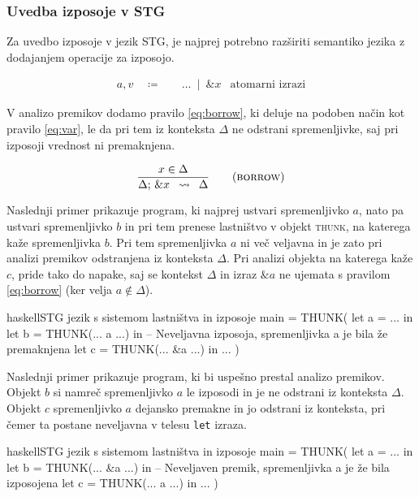 \subsubsection{Uvedba izposoje v STG}

Za uvedbo izposoje v jezik STG, je najprej potrebno razširiti semantiko jezika z dodajanjem operacije za izposojo.

\begin{align*}
	a, v \quad \coloneq& \quad \dots \enspace \vert \enspace \& x & \text{atomarni izrazi}
\end{align*}


V analizo premikov dodamo pravilo \ref{eq:borrow}, ki deluje na podoben način kot pravilo \ref{eq:var}, le da pri tem iz konteksta $\Delta$ ne odstrani spremenljivke, saj pri izposoji vrednost ni premaknjena.

\begin{equation}
\infers[borrow]{
    x \in \Delta
}{
    \Delta; \, \& x
}{
	\Delta
}
\label{eq:borrow}
\end{equation}

Naslednji primer prikazuje program, ki najprej ustvari spremenljivko $a$, nato pa ustvari spremenljivko $b$ in pri tem prenese lastništvo v objekt \textsc{thunk}, na katerega kaže spremenljivka $b$. Pri tem spremenljivka $a$ ni več veljavna in je zato pri analizi premikov odstranjena iz konteksta $\Delta$. Pri analizi objekta na katerega kaže $c$, pride tako do napake, saj se kontekst $\Delta$ in izraz $\&a$ ne ujemata s pravilom \ref{eq:borrow} (ker velja $a \notin \Delta$).

\begin{code-box}{haskell}{STG jezik s sistemom lastništva in izposoje \xmark}
main = THUNK(
    let a = ... in
    let b = THUNK(... a ...) in
    -- Neveljavna izposoja, spremenljivka a je bila že premaknjena
    let c = THUNK(... &a ...) in 
        ...
)
\end{code-box}

Naslednji primer prikazuje program, ki bi uspešno prestal analizo premikov. Objekt $b$ si namreč spremenljivko $a$ le izposodi in je ne odstrani iz konteksta $\Delta$. Objekt $c$ spremenljivko $a$ dejansko premakne in jo odstrani iz konteksta, pri čemer ta postane neveljavna v telesu \texttt{let} izraza.

\begin{code-box}{haskell}{STG jezik s sistemom lastništva in izposoje \cmark}
main = THUNK(
    let a = ... in
    let b = THUNK(... &a ...) in
    -- Neveljaven premik, spremenljivka a je že bila izposojena
    let c = THUNK(... a ...) in
        ...
)
\end{code-box}

